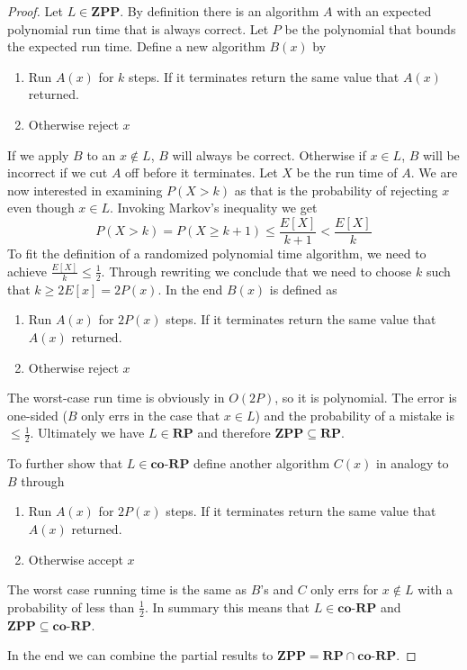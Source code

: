 \documentclass[10pt,a4paper]{article}
\begin{document}
\begin{proof}
  \vspace{1em}

  Let $L \in \mathbf{ZPP}$.
  By definition there is an algorithm $A$ with an expected polynomial run time that is always correct.
  Let $P$ be the polynomial that bounds the expected run time.
  Define a new algorithm $B(x)$ by
  \begin{enumerate}
  \item Run $A(x)$ for $k$ steps. If it terminates return the same value that $A(x)$ returned.
  \item Otherwise reject $x$
  \end{enumerate}
  If we apply $B$ to an $x \notin L$, $B$ will always be correct.
  Otherwise if $x \in L$, $B$ will be incorrect if we cut $A$ off before it terminates.
  Let $X$ be the run time of $A$.
  We are now interested in examining $P(X > k)$ as that is the probability of rejecting $x$ even though $x \in L$.
  Invoking Markov's inequality we get
  \begin{equation*}
    P(X > k) = P(X \ge k + 1) \le \frac{E[X]}{k + 1} < \frac{E[X]}{k}
  \end{equation*}
  To fit the definition of a randomized polynomial time algorithm, we need to achieve $\frac{E[X]}{k} \le \frac{1}{2}$.
  Through rewriting we conclude that we need to choose $k$ such that $k \ge 2E[x] = 2P(x)$.
  In the end $B(x)$ is defined as
  \begin{enumerate}
  \item Run $A(x)$ for $2P(x)$ steps. If it terminates return the same value that $A(x)$ returned.
  \item Otherwise reject $x$
  \end{enumerate}
  The worst-case run time is obviously in $O(2P)$, so it is polynomial.
  The error is one-sided ($B$ only errs in the case that $x \in L$) and the probability of a mistake is $\le \frac{1}{2}$.
  Ultimately we have $L \in \mathbf{RP}$ and therefore $\mathbf{ZPP} \subseteq \mathbf{RP}$.

  \vspace{1em}

  To further show that $L \in \mathbf{co\text{-}RP}$ define another algorithm $C(x)$ in analogy to $B$ through
  \begin{enumerate}
  \item Run $A(x)$ for $2P(x)$ steps. If it terminates return the same value that $A(x)$ returned.
  \item Otherwise accept $x$
  \end{enumerate}
  The worst case running time is the same as $B$'s and $C$ only errs for $x \notin L$ with a probability of less than $\frac{1}{2}$.
  In summary this means that $L \in \mathbf{co\text{-}RP}$ and $\mathbf{ZPP} \subseteq \mathbf{co\text{-}RP}$.

  \vspace{1em}

  In the end we can combine the partial results to $\mathbf{ZPP} = \mathbf{RP} \cap \mathbf{co \text{-} RP}$.
\end{proof}
\end{document}
